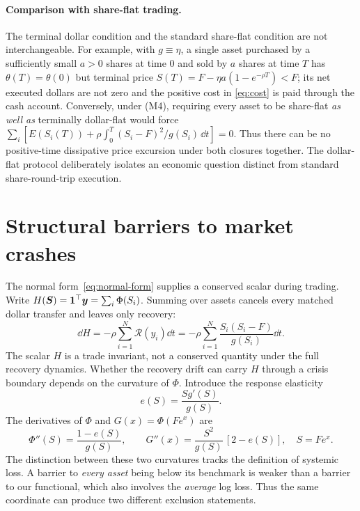 \documentclass[review,hidelinks,onefignum,onetabnum]{siamonline250211}
\begin{document}
\paragraph{Comparison with share-flat trading.}
The terminal dollar condition and the standard share-flat condition are not interchangeable. For example, with $g\equiv\eta$, a single asset purchased by a sufficiently small $a>0$ shares at time $0$ and sold by $a$ shares at time $T$ has $\theta(T)=\theta(0)$ but terminal price $S(T)=F-\eta a(1-e^{-\rho T})<F$; its net executed dollars are not zero and the positive cost in \eqref{eq:cost} is paid through the cash account. Conversely, under (M4), requiring every asset to be share-flat \emph{as well as} terminally dollar-flat would force $\sum_i[E(S_i(T))+\rho\int_0^T(S_i-F)^2/g(S_i)\,\dd t]=0$. Thus there can be no positive-time dissipative price excursion under both closures together. The dollar-flat protocol deliberately isolates an economic question distinct from standard share-round-trip execution.

\section{Structural barriers to market crashes}\label{sec:barriers}
The normal form~\eqref{eq:normal-form} supplies a conserved scalar during trading. Write $H(\bm S)=\mathbf{1}^\top\bm y=\sum_i\Phi(S_i)$. Summing over assets cancels every matched dollar transfer and leaves only recovery:
\begin{equation}\label{eq:potential-law}
\boxed{\dd H=-\rho\sum_{i=1}^N\mathcal R(y_i)\dd t
=-\rho\sum_{i=1}^N\frac{S_i(S_i-F)}{g(S_i)}\dd t.}
\end{equation}
The scalar $H$ is a trade invariant, not a conserved quantity under the full recovery dynamics. Whether the recovery drift can carry $H$ through a crisis boundary depends on the curvature of $\Phi$.
Introduce the response elasticity
\begin{equation}\label{eq:elasticity}
e(S)=\frac{Sg'(S)}{g(S)}.
\end{equation}
The derivatives of $\Phi$ and $G(x)=\Phi(Fe^x)$ are
\begin{equation}\label{eq:curvature}
\Phi''(S)=\frac{1-e(S)}{g(S)},\qquad
G''(x)=\frac{S^2}{g(S)}\,[2-e(S)],\quad S=Fe^x.
\end{equation}
The distinction between these two curvatures tracks the definition of systemic loss. A barrier to \emph{every asset} being below its benchmark is weaker than a barrier to our functional, which also involves the \emph{average} log loss. Thus the same coordinate can produce two different exclusion statements.
\end{document}
